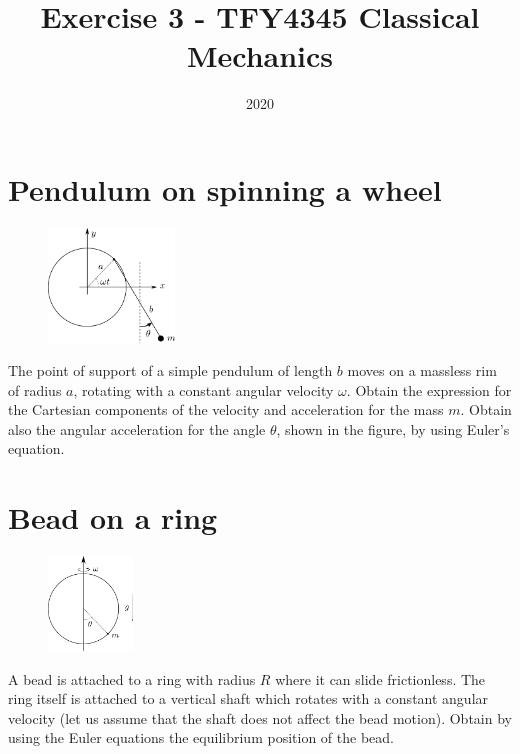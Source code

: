 \documentclass{article}
\title{Exercise 3 - TFY4345 Classical Mechanics}
\date{2020}
\begin{document}
    \maketitle
    \section{Pendulum on spinning a wheel}
    \begin{figure}
        \vspace{-1cm}
        \includegraphics[width=0.3\textwidth]{figures/figure_1.pdf}
        \vspace{-2cm}
    \end{figure}
    The point of support of a simple pendulum of length $b$ moves on a massless rim of radius $a$, rotating with a constant angular velocity $\omega$. Obtain the expression for the Cartesian components of the velocity and acceleration for the mass $m$. Obtain also the angular acceleration for the angle $\theta$, shown in the figure, by using Euler's equation.

    \section{Bead on a ring}
    \begin{figure}
        \includegraphics[width=0.2\textwidth]{figures/figure_2.pdf}
    \end{figure}
    A bead is attached to a ring with radius $R$ where it can slide frictionless. The ring itself is attached to a vertical shaft which rotates with a constant angular velocity (let us assume that the shaft does not affect the bead motion). Obtain by using the Euler equations the equilibrium position of the bead.
\end{document}
